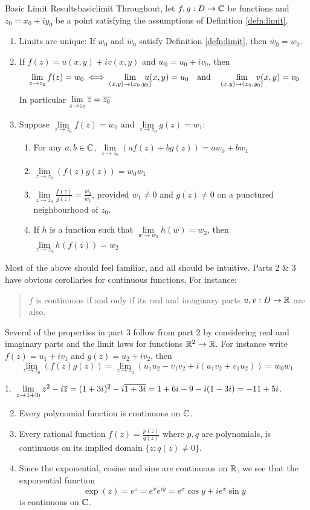 \begin{thm}{Basic Limit Results}{basiclimit}
Throughout, let $f,g:D\to\mathbb{C}$ be functions and $z_0=x_0+iy_0$ be a point satisfying the assumptions of Definition \ref{defn:limit}.
\begin{enumerate}
  \item Limits are unique: If $w_0$ and $\widetilde{w_0}$ satisfy Definition \ref{defn:limit}, then $\widetilde{w_0}=w_0$.
  \item\label{thmbaslim2} If $f(z)=u(x,y)+iv(x,y)$ and $w_0=u_0+iv_0$, then
  \[\lim_{z\to z_0}f(z)=w_0\iff \lim_{(x,y)\to (x_0,y_0)}\hspace*{-10pt} u(x,y)=u_0\quad \text{and}\quad \lim_{(x,y)\to (x_0,y_0)}\hspace*{-10pt} v(x,y)=v_0\]
  In particular $\lim\limits_{z\to z_0}\overline{z}=\overline{z_0}$
  \item Suppose $\lim\limits_{z\to z_0}f(z)=w_0$ and $\lim\limits_{z\to z_0}g(z)=w_1$:
  \begin{enumerate}
    \item For any $a,b\in\mathbb{C}$, $\lim\limits_{z\to z_0}(af(z)+bg(z))=aw_0+bw_1$
    \item $\lim\limits_{z\to z_0}(f(z)g(z))=w_0w_1$
    \item $\lim\limits_{z\to z_0}\frac{f(z)}{g(z)}=\frac{w_0}{w_1}$, provided $w_1\neq 0$ and $g(z)\neq 0$ on a punctured neighbourhood of $z_0$.
    \item If $h$ is a function such that $\lim\limits_{w\to w_0}h(w)=w_2$, then $\lim\limits_{z\to z_0}h(f(z))=w_2$
	\end{enumerate}
\end{enumerate}
\end{thm}

Most of the above should feel familiar, and all should be intuitive. Parts 2 \& 3 have obvious corollaries for continuous functions. For instance:
\begin{quote}
$f$ is continuous if and only if its real and imaginary parts $u,v:D\to\mathbb{R}$ are also. 
\end{quote}
Several of the properties in part 3 follow from part 2 by considering real and imaginary parts and the limit laws for functions $\mathbb{R}^2\to\mathbb{R}$. For instance write $f(z)=u_1+iv_1$ and $g(z)=u_2+iv_2$, then
\[\lim\limits_{z\to z_0}(f(z)g(z))=\lim\limits_{z\to z_0}(u_1u_2-v_1v_2+i(u_1v_2+v_1u_2))=w_0w_1\]

\begin{examples}{}{}
\hangindent\leftmargini
\textup{1.}\ $\lim\limits_{z\to 1+3i}z^2-i\overline{z} =(1+3i)^2-i\overline{1+3i} =1+6i-9-i(1-3i)=-11+5i$.
\begin{enumerate}\setcounter{enumi}{1}
  \item Every polynomial function is continuous on $\mathbb{C}$.
  \item Every rational function $f(z)=\frac{p(z)}{q(z)}$ where $p,q$ are polynomials, is continuous on its implied domain $\{z:q(z)\neq 0\}$.
  \item Since the exponential, cosine and sine are continuous on $\mathbb{R}$, we see that the exponential function
  \[\exp(z)=e^z=e^xe^{iy}=e^x\cos y+ie^x\sin y\]
  is continuous on $\mathbb{C}$.
\end{enumerate}
\end{examples}

